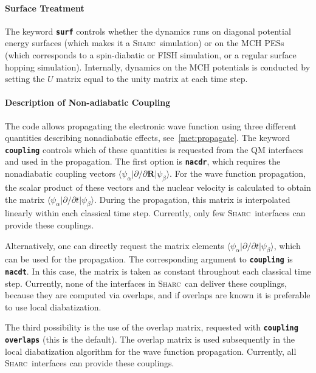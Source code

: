 \documentclass[a4paper,10pt,DIV=15,openany]{scrbook}
\newcommand{\sharc}{\textsc{Sharc}}
\newcommand{\ttt}[1]{\textbf{\texttt{#1}}}
\newcommand{\VEC}[1]{\ensuremath{\mathbf{#1}}}
\begin{document}
\paragraph{Surface Treatment}

The keyword \ttt{surf} controls whether the dynamics runs on diagonal potential energy surfaces (which makes it a \sharc\ simulation) or on the MCH PESs (which corresponds to a spin-diabatic \cite{Granucci2012JCP} or FISH \cite{Mitric2009PRA} simulation, or a regular surface hopping simulation). Internally, dynamics on the MCH potentials is conducted by setting the $U$ matrix equal to the unity matrix at each time step. 

\paragraph{Description of Non-adiabatic Coupling}

The code allows propagating the electronic wave function using three different quantities describing nonadiabatic effects, see~\ref{met:propagate}. The keyword \ttt{coupling} controls which of these quantities is requested from the QM interfaces and used in the propagation. The first option is \ttt{nacdr}, which requires the nonadiabatic coupling vectors $\langle\psi_\alpha|\partial/\partial \VEC{R}|\psi_\beta\rangle$. For the wave function propagation, the scalar product of these vectors and the nuclear velocity is calculated to obtain the matrix $\langle\psi_\alpha|\partial/\partial t|\psi_\beta\rangle$. During the propagation, this matrix is interpolated linearly within each classical time step. Currently, only few \sharc\ interfaces can provide these couplings.

Alternatively, one can directly request the matrix elements $\langle\psi_\alpha|\partial/\partial t|\psi_\beta\rangle$, which can be used for the propagation. The corresponding argument to \ttt{coupling} is \ttt{nacdt}. In this case, the matrix is taken as constant throughout each classical time step. Currently, none of the interfaces in \sharc\ can deliver these couplings, because they are computed via overlaps, and if overlaps are known it is preferable to use local diabatization.

The third possibility is the use of the overlap matrix, requested with \ttt{coupling overlaps} (this is the default). The overlap matrix is used subsequently in the local diabatization algorithm for the wave function propagation. Currently, all \sharc\ interfaces can provide these couplings.
\end{document}

